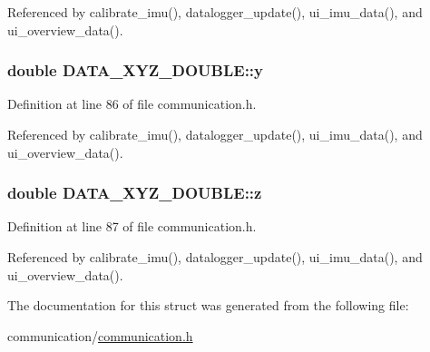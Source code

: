 Referenced by calibrate\_\-imu(), datalogger\_\-update(), ui\_\-imu\_\-data(), and ui\_\-overview\_\-data().

\hypertarget{structDATA__XYZ__DOUBLE_a198a27b5df3b5b0bf461b0e481e22a82}{
\subsubsection[{y}]{\setlength{\rightskip}{0pt plus 5cm}double {\bf DATA\_\-XYZ\_\-DOUBLE::y}}}
\label{structDATA__XYZ__DOUBLE_a198a27b5df3b5b0bf461b0e481e22a82}


Definition at line 86 of file communication.h.



Referenced by calibrate\_\-imu(), datalogger\_\-update(), ui\_\-imu\_\-data(), and ui\_\-overview\_\-data().

\hypertarget{structDATA__XYZ__DOUBLE_a9556e8868c223ff3e28756ea18a284c0}{
\subsubsection[{z}]{\setlength{\rightskip}{0pt plus 5cm}double {\bf DATA\_\-XYZ\_\-DOUBLE::z}}}
\label{structDATA__XYZ__DOUBLE_a9556e8868c223ff3e28756ea18a284c0}


Definition at line 87 of file communication.h.



Referenced by calibrate\_\-imu(), datalogger\_\-update(), ui\_\-imu\_\-data(), and ui\_\-overview\_\-data().



The documentation for this struct was generated from the following file:\begin{DoxyCompactItemize}
\item 
communication/\hyperlink{communication_8h}{communication.h}\end{DoxyCompactItemize}

